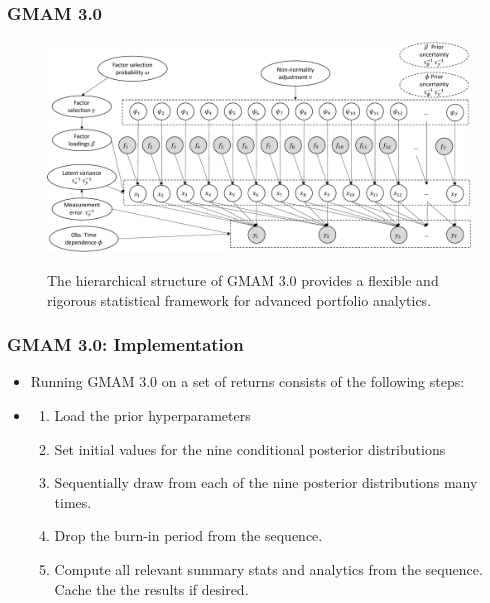 \documentclass[10pt, compress]{beamer}
\begin{document}
\begin{frame}[fragile]
\frametitle{GMAM 3.0}
\begin{figure}
	\centering
	\includegraphics[width=1.04\linewidth]{docs/theory/DAG.pdf}\\
    \bigskip
    \begin{kicker}
        The hierarchical structure of GMAM 3.0 provides a flexible and rigorous statistical framework for advanced portfolio analytics.
    \end{kicker}
\end{figure}

\end{frame}




\begin{frame}[fragile]
\frametitle{GMAM 3.0: Implementation}
\begin{itemize}
    \item Running GMAM 3.0 on a set of returns consists of the following steps:
    \item []
    \begin{enumerate}
        \item Load the prior hyperparameters
        \item Set initial values for the nine conditional posterior distributions 
        \item Sequentially draw from each of the nine posterior distributions many times.
        \item Drop the burn-in period from the sequence.
        \item Compute all relevant summary stats and analytics from the sequence. Cache the the results if desired.
    \end{enumerate}
\end{itemize}
\end{frame}
\end{document}

